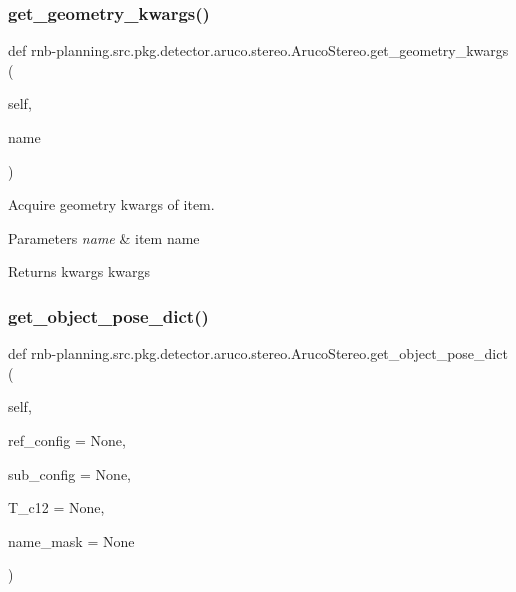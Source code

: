 \subsubsection{\texorpdfstring{get\+\_\+geometry\+\_\+kwargs()}{get\_geometry\_kwargs()}}
{\footnotesize\ttfamily def rnb-\/planning.\+src.\+pkg.\+detector.\+aruco.\+stereo.\+Aruco\+Stereo.\+get\+\_\+geometry\+\_\+kwargs (\begin{DoxyParamCaption}\item[{}]{self,  }\item[{}]{name }\end{DoxyParamCaption})}



Acquire geometry kwargs of item. 


\begin{DoxyParams}{Parameters}
{\em name} & item name \\
\hline
\end{DoxyParams}
\begin{DoxyReturn}{Returns}
kwargs kwargs 
\end{DoxyReturn}
\mbox{\label{classrnb-planning_1_1src_1_1pkg_1_1detector_1_1aruco_1_1stereo_1_1_aruco_stereo_a6ca0715958847631f53e254622919ebb}} 
\subsubsection{\texorpdfstring{get\+\_\+object\+\_\+pose\+\_\+dict()}{get\_object\_pose\_dict()}}
{\footnotesize\ttfamily def rnb-\/planning.\+src.\+pkg.\+detector.\+aruco.\+stereo.\+Aruco\+Stereo.\+get\+\_\+object\+\_\+pose\+\_\+dict (\begin{DoxyParamCaption}\item[{}]{self,  }\item[{}]{ref\+\_\+config = {\ttfamily None},  }\item[{}]{sub\+\_\+config = {\ttfamily None},  }\item[{}]{T\+\_\+c12 = {\ttfamily None},  }\item[{}]{name\+\_\+mask = {\ttfamily None} }\end{DoxyParamCaption})}



